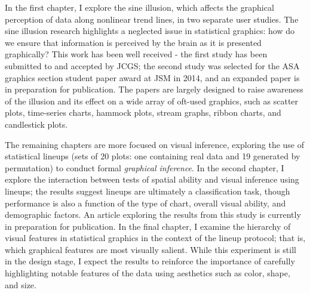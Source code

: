 \documentclass[10.5pt,letterpaper,sans,unicode]{moderncv}        %
\begin{document}
In the first chapter, I explore the sine illusion, which affects the graphical perception of data along nonlinear trend lines, in two separate user studies. 
The sine illusion research highlights a neglected issue in statistical graphics: how do we ensure that information is perceived by the brain as it is presented graphically? This work has been well received - the first study has been submitted to and accepted by JCGS; the second study was selected for the ASA graphics section student paper award at JSM in 2014, and an expanded paper is in preparation for publication. The papers are largely designed to raise awareness of the illusion and its effect on a wide array of oft-used graphics, such as scatter plots, time-series charts, hammock plots, stream graphs, ribbon charts, and candlestick plots. 

The remaining chapters are more focused on visual inference, exploring the use of statistical lineups (sets of 20 plots: one containing real data and 19 generated by permutation) to conduct formal \textit{graphical inference}. 
In the second chapter, I explore the interaction between tests of spatial ability and visual inference using lineups; the results suggest lineups are ultimately a classification task, though performance is also a function of the type of chart, overall visual ability, and demographic factors.
An article exploring the results from this study is currently in preparation for publication.
In the final chapter, I examine the hierarchy of visual features in statistical graphics in the context of the lineup protocol; that is, which graphical features are most visually salient.
While this experiment is still in the design stage, I expect the results to reinforce the importance of carefully highlighting notable features of the data using aesthetics such as color, shape, and size.
\end{document}
